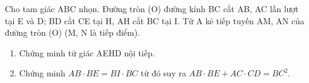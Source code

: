 \begin{ex}
Cho tam giác ABC nhọn. Đường tròn (O) đường kính BC cắt AB, AC lần lượt tại E và D; BD cắt CE tại H, AH cắt BC tại I. Từ A kẻ tiếp tuyến AM, AN của đường tròn (O) (M, N là tiếp điểm).
	\begin{enumerate}
		\item[a)] Chứng minh tứ giác AEHD nội tiếp.
		\item[b)] Chứng minh $AB \cdot BE = BI \cdot BC$ từ đó suy ra $AB \cdot BE + AC \cdot CD = BC^2$.
	\end{enumerate}
\end{ex}
